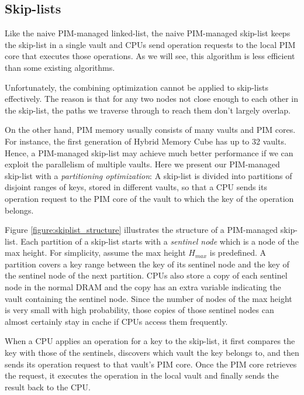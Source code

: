 \subsection{Skip-lists}
\label{section:skip_list}


Like the naive PIM-managed linked-list,
the naive PIM-managed skip-list keeps the skip-list in a single vault and
CPUs send operation requests to the local PIM core that executes those operations.
As we will see, this algorithm is less efficient than some existing algorithms.

Unfortunately, the combining optimization cannot be applied to skip-lists effectively.
The reason is that for any two nodes not close enough to each other in the skip-list,
the paths we traverse through to reach them don't largely overlap.

On the other hand, PIM memory usually consists of many vaults and PIM cores.
For instance, the first generation of Hybrid Memory Cube \cite{website:HMC} has up to 32 vaults.
Hence, a PIM-managed skip-list may achieve much better performance if
we can exploit the parallelism of multiple vaults.
Here we present our PIM-managed skip-list with a \textit{partitioning optimization}:
A skip-list is divided into partitions of disjoint ranges of keys,
stored in different vaults, so that a CPU sends its operation request to
the PIM core of the vault to which the key of the operation belongs.

Figure \ref{figure:skiplist_structure} illustrates the structure of a PIM-managed skip-list.
Each partition of a skip-list starts with a \textit{sentinel node}
which is a node of the max height. 
For simplicity, assume the max height $H_{max}$ is predefined.
A partition covers a key range between the key of its sentinel node and
the key of the sentinel node of the next partition.
CPUs also store a copy of each sentinel node in the normal DRAM and 
the copy has an extra variable indicating the vault containing the sentinel node.
Since the number of nodes of the max height is very small with high probability, 
those copies of those sentinel nodes can almost certainly stay in cache
if CPUs access them frequently.

When a CPU applies an operation for a key to the skip-list,
it first compares the key with those of the sentinels, discovers which vault
the key belongs to, and then sends its operation request to that vault's PIM core.
Once the PIM core retrieves the request, it executes the operation in the local vault 
and finally sends the result back to the CPU.


